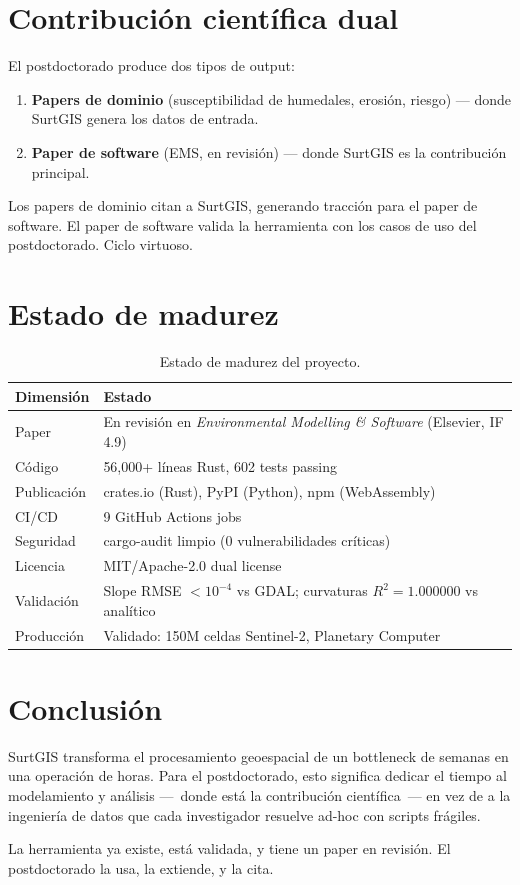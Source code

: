 \documentclass[11pt,a4paper]{article}
\begin{document}
\section{Contribuci\'on cient\'ifica dual}

El postdoctorado produce dos tipos de output:

\begin{enumerate}
\item \textbf{Papers de dominio} (susceptibilidad de humedales, erosi\'on, riesgo) --- donde SurtGIS genera los datos de entrada.
\item \textbf{Paper de software} (EMS, en revisi\'on) --- donde SurtGIS es la contribuci\'on principal.
\end{enumerate}

Los papers de dominio citan a SurtGIS, generando tracci\'on para el paper de software. El paper de software valida la herramienta con los casos de uso del postdoctorado. Ciclo virtuoso.

\section{Estado de madurez}

\begin{table}[h]
\centering
\small
\begin{tabularx}{\textwidth}{lX}
\toprule
\textbf{Dimensi\'on} & \textbf{Estado} \\
\midrule
Paper & En revisi\'on en \textit{Environmental Modelling \& Software} (Elsevier, IF 4.9) \\
C\'odigo & 56,000+ l\'ineas Rust, 602 tests passing \\
Publicaci\'on & crates.io (Rust), PyPI (Python), npm (WebAssembly) \\
CI/CD & 9 GitHub Actions jobs \\
Seguridad & cargo-audit limpio (0 vulnerabilidades cr\'iticas) \\
Licencia & MIT/Apache-2.0 dual license \\
Validaci\'on & Slope RMSE $< 10^{-4}$\textdegree{} vs GDAL; curvaturas $R^2 = 1.000000$ vs anal\'itico \\
Producci\'on & Validado: 150M celdas Sentinel-2, Planetary Computer \\
\bottomrule
\end{tabularx}
\caption{Estado de madurez del proyecto.}
\end{table}

\section{Conclusi\'on}

SurtGIS transforma el procesamiento geoespacial de un bottleneck de semanas en una operaci\'on de horas. Para el postdoctorado, esto significa dedicar el tiempo al modelamiento y an\'alisis ---~donde est\'a la contribuci\'on cient\'ifica~--- en vez de a la ingenier\'ia de datos que cada investigador resuelve ad-hoc con scripts fr\'agiles.

La herramienta ya existe, est\'a validada, y tiene un paper en revisi\'on. El postdoctorado la usa, la extiende, y la cita.
\end{document}
